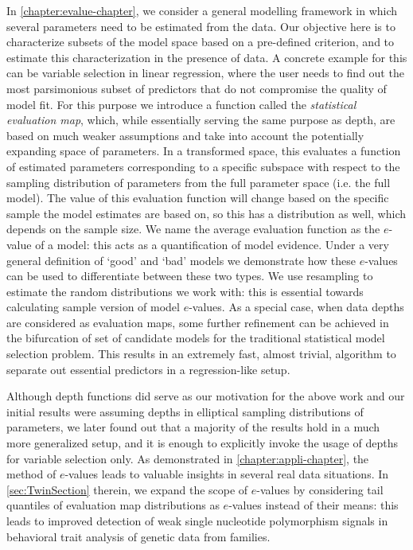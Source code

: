 In \ref{chapter:evalue-chapter}, we consider a general modelling framework in which several parameters need to be estimated from the data. Our objective here is to characterize subsets of the model space based on a pre-defined criterion, and to estimate this characterization in the presence of data. A concrete example for this can be variable selection in linear regression, where the user needs to find out the most parsimonious subset of predictors that do not compromise the quality of model fit. For this purpose we introduce a function called the \textit{statistical evaluation map}, which, while essentially serving the same purpose as depth, are based on much weaker assumptions and take into account the potentially expanding space of parameters. In a transformed space, this evaluates a function of estimated parameters corresponding to a specific subspace with respect to the sampling distribution of parameters from the full parameter space (i.e. the full model). The value of this evaluation function will change based on the specific sample the model estimates are based on, so this has a distribution as well, which depends on the sample size. We name the average evaluation function as the $e$-value of a model: this acts as a quantification of model evidence. Under a very general definition of `good' and `bad' models we demonstrate how these $e$-values can be used to differentiate between these two types. We use resampling to estimate the random distributions we work with: this is essential towards calculating sample version of model $e$-values. As a special case, when data depths are considered as evaluation maps, some further refinement can be achieved in the bifurcation of set of candidate models for the traditional statistical model selection problem. This results in an extremely fast, almost trivial, algorithm to separate out essential predictors in a regression-like setup.

Although depth functions did serve as our motivation for the above work and our initial results were assuming depths in elliptical sampling distributions of parameters, we later found out that a majority of the results hold in a much more generalized setup, and it is enough to explicitly invoke the usage of depths for variable selection only. As demonstrated in \ref{chapter:appli-chapter}, the method of $e$-values leads to valuable insights in several real data situations. In \ref{sec:TwinSection} therein, we expand the scope of $e$-values by considering tail quantiles of evaluation map distributions as $e$-values instead of their means: this leads to improved detection of weak single nucleotide polymorphism signals in behavioral trait analysis of genetic data from families.

